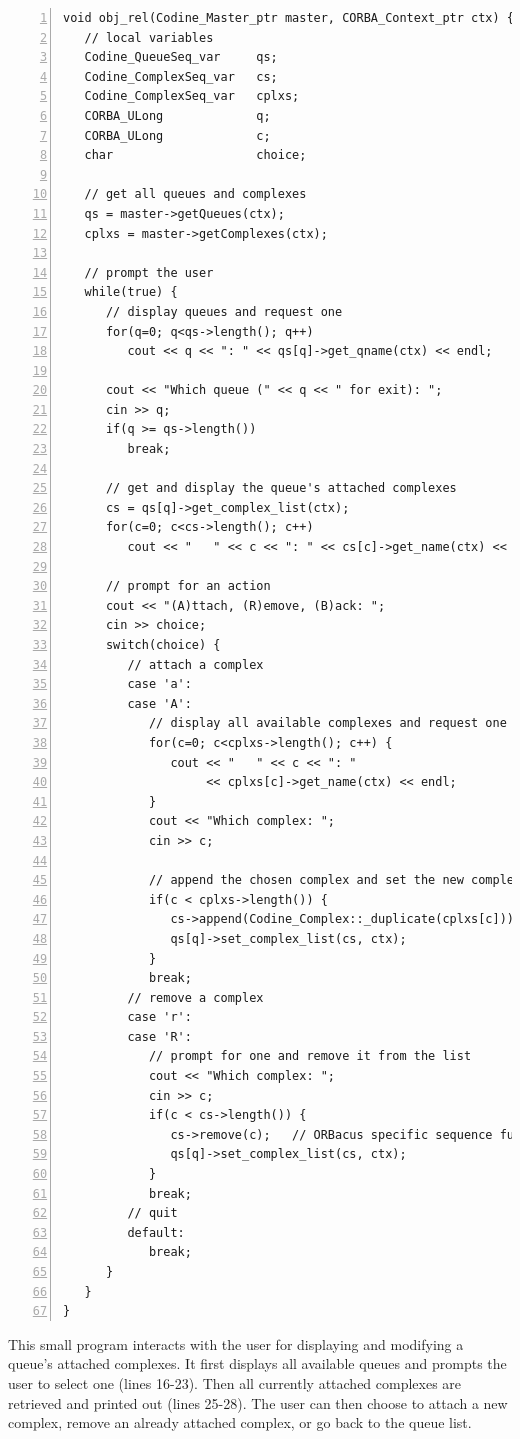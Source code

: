 \begin{Verbatim}[frame=lines, numbers=left, fontsize=\small, framerule=1mm]
void obj_rel(Codine_Master_ptr master, CORBA_Context_ptr ctx) {
   // local variables
   Codine_QueueSeq_var     qs;
   Codine_ComplexSeq_var   cs;
   Codine_ComplexSeq_var   cplxs;
   CORBA_ULong             q;
   CORBA_ULong             c;
   char                    choice;

   // get all queues and complexes
   qs = master->getQueues(ctx);
   cplxs = master->getComplexes(ctx);

   // prompt the user
   while(true) {
      // display queues and request one
      for(q=0; q<qs->length(); q++)
         cout << q << ": " << qs[q]->get_qname(ctx) << endl;

      cout << "Which queue (" << q << " for exit): ";
      cin >> q;
      if(q >= qs->length())
         break;

      // get and display the queue's attached complexes
      cs = qs[q]->get_complex_list(ctx);
      for(c=0; c<cs->length(); c++)
         cout << "   " << c << ": " << cs[c]->get_name(ctx) << endl;

      // prompt for an action
      cout << "(A)ttach, (R)emove, (B)ack: ";
      cin >> choice;
      switch(choice) {
         // attach a complex
         case 'a':
         case 'A':
            // display all available complexes and request one
            for(c=0; c<cplxs->length(); c++) {
               cout << "   " << c << ": " 
                    << cplxs[c]->get_name(ctx) << endl;
            }
            cout << "Which complex: ";
            cin >> c;
            
            // append the chosen complex and set the new complex list
            if(c < cplxs->length()) {
               cs->append(Codine_Complex::_duplicate(cplxs[c]));
               qs[q]->set_complex_list(cs, ctx);
            }
            break;
         // remove a complex
         case 'r':
         case 'R':
            // prompt for one and remove it from the list
            cout << "Which complex: ";
            cin >> c;
            if(c < cs->length()) {
               cs->remove(c);   // ORBacus specific sequence function
               qs[q]->set_complex_list(cs, ctx);
            }
            break;
         // quit
         default:
            break;
      }
   } 
}
\end{Verbatim}

This small program interacts with the user for displaying and modifying a
queue's attached complexes. It first displays all available queues and
prompts the user to select one (lines 16-23). Then all currently attached
complexes are retrieved and printed out (lines 25-28). The user can then
choose to attach a new complex, remove an already attached complex, or go
back to the queue list. 

